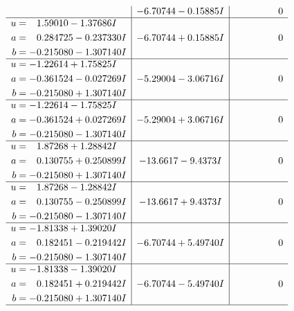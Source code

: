 \documentclass[1p]{elsarticle_modified}
\theoremstyle{definition}
\begin{document}
$$\begin{array}{c|c|c}
 & -6.70744 - 0.15885 I & \phantom{-0.000000 } 0 \\ \hline\begin{aligned}
u &= \phantom{-}1.59010 - 1.37686 I \\
a &= \phantom{-}0.284725 - 0.237330 I \\
b &= -0.215080 - 1.307140 I\end{aligned}
 & -6.70744 + 0.15885 I & \phantom{-0.000000 } 0 \\ \hline\begin{aligned}
u &= -1.22614 + 1.75825 I \\
a &= -0.361524 - 0.027269 I \\
b &= -0.215080 + 1.307140 I\end{aligned}
 & -5.29004 - 3.06716 I & \phantom{-0.000000 } 0 \\ \hline\begin{aligned}
u &= -1.22614 - 1.75825 I \\
a &= -0.361524 + 0.027269 I \\
b &= -0.215080 - 1.307140 I\end{aligned}
 & -5.29004 + 3.06716 I & \phantom{-0.000000 } 0 \\ \hline\begin{aligned}
u &= \phantom{-}1.87268 + 1.28842 I \\
a &= \phantom{-}0.130755 + 0.250899 I \\
b &= -0.215080 + 1.307140 I\end{aligned}
 & -13.6617 - 9.4373 I & \phantom{-0.000000 } 0 \\ \hline\begin{aligned}
u &= \phantom{-}1.87268 - 1.28842 I \\
a &= \phantom{-}0.130755 - 0.250899 I \\
b &= -0.215080 - 1.307140 I\end{aligned}
 & -13.6617 + 9.4373 I & \phantom{-0.000000 } 0 \\ \hline\begin{aligned}
u &= -1.81338 + 1.39020 I \\
a &= \phantom{-}0.182451 - 0.219442 I \\
b &= -0.215080 - 1.307140 I\end{aligned}
 & -6.70744 + 5.49740 I & \phantom{-0.000000 } 0 \\ \hline\begin{aligned}
u &= -1.81338 - 1.39020 I \\
a &= \phantom{-}0.182451 + 0.219442 I \\
b &= -0.215080 + 1.307140 I\end{aligned}
 & -6.70744 - 5.49740 I & \phantom{-0.000000 } 0\\
 \hline 
 \end{array}$$\newpage\newpage\renewcommand{\arraystretch}{1}
\end{document}
